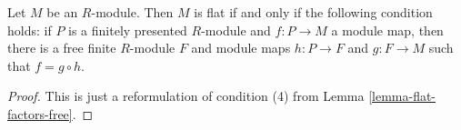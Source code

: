 \begin{lemma}
\label{lemma-flat-factors-fp}
Let $M$ be an $R$-module.  Then $M$ is flat if and only if the following
condition holds: if $P$ is a finitely presented $R$-module and $f: P
\to M$ a module map, then there is a free finite $R$-module $F$ and
module maps $h: P \to F$ and $g: F \to M$ such that $f = g
\circ h$.
\end{lemma}

\begin{proof}
This is just a reformulation of condition (4) from
Lemma \ref{lemma-flat-factors-free}.
\end{proof}
